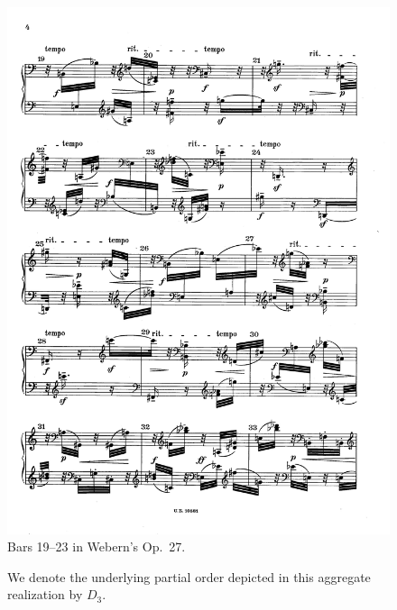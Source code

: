\begin{example}
	\begin{figure}[htbp]
    	\centering
		\includegraphics[width=6.5in]{figures/webern3.pdf}
		\caption[Bars 19--23 in Webern's Op.~27]{Bars 19--23 in Webern's Op.~27.}
    	\label{fig:webern-27-c}
	\end{figure}

	\begin{figure}[htbp]
    	\centering
		\caption[An Aggregate Realization of Bars 19--23 in Webern's Op.~27]{We denote the underlying partial order depicted in this aggregate realization by $D_3$.}
    	\label{fig:webern-aggregate-d}
	\end{figure}


\end{example}
